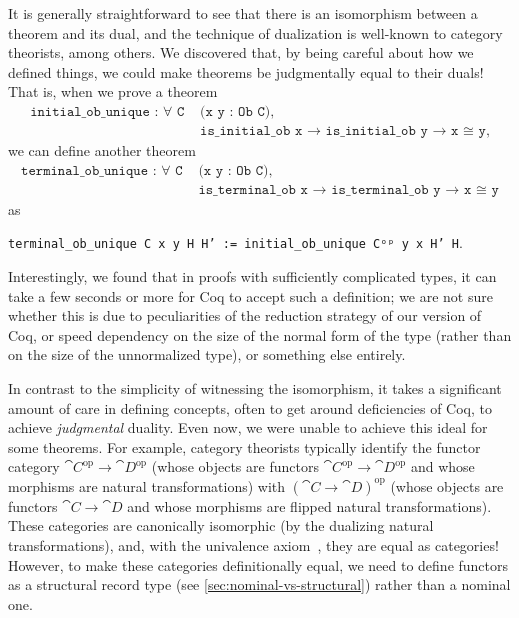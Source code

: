   It is generally straightforward to see that there is an isomorphism between a theorem and its dual, and the technique of dualization is well-known to category theorists, among others.  We discovered that, by being careful about how we defined things, we could make theorems be judgmentally equal to their duals!  That is, when we prove a theorem
  \begin{align*}
  \texttt{initial_ob_unique : ∀ C  } & \texttt{(x y : Ob C),} \\
  & \texttt{is_initial_ob x → is_initial_ob y → x ≅ y},
  \end{align*}
  we can define another theorem
  \begin{align*}
  \texttt{terminal_ob_unique : ∀ C  }& \texttt{(x y : Ob C),} \\
  & \texttt{is_terminal_ob x → is_terminal_ob y → x ≅ y}
  \end{align*}
  as
  \begin{center}
  \texttt{terminal_ob_unique C x y H H' := initial_ob_unique Cᵒᵖ y x H' H}.
  \end{center}
  Interestingly, we found that in proofs with sufficiently complicated types, it can take a few seconds or more for Coq to accept such a definition; we are not sure whether this is due to peculiarities of the reduction strategy of our version of Coq, or speed dependency on the size of the normal form of the type (rather than on the size of the unnormalized type), or something else entirely.

  In contrast to the simplicity of witnessing the isomorphism, it takes a significant amount of care in defining concepts, often to get around deficiencies of Coq, to achieve \emph{judgmental} duality.
  Even now, we were unable to achieve this ideal for some theorems.
  For example, category theorists typically identify the functor category $\cat{C}^\text{op} \to \cat{D}^\text{op}$ (whose objects are functors $\cat{C}^\text{op} \to \cat{D}^\text{op}$ and whose morphisms are natural transformations) with $(\cat{C} \to \cat{D})^\text{op}$ (whose objects are functors $\cat{C} \to \cat{D}$ and whose morphisms are flipped natural transformations).
  These categories are canonically isomorphic (by the dualizing natural transformations), and, with the univalence axiom~\cite{HoTTBook}, they are equal as categories!
  However, to make these categories definitionally equal, we need to define functors as a structural record type (see \autoref{sec:nominal-vs-structural}) rather than a nominal one.

